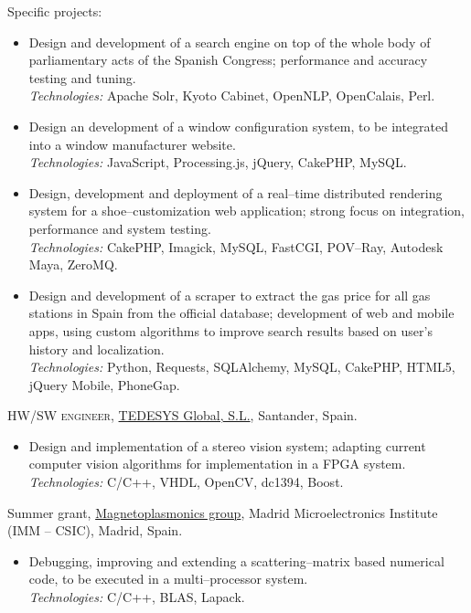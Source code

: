 \documentclass[11pt]{article}
\newcommand{\years}[1]{\marginnote{\scriptsize #1}}
\begin{document}
Specific projects:
\begin{itemize}
	\item  Design and development of a search engine on top of the whole body of parliamentary acts of the Spanish Congress; performance and accuracy testing and tuning.\\
	\textit{Technologies:} Apache Solr, Kyoto Cabinet, OpenNLP, OpenCalais, Perl.
	\item  Design an development of a window configuration system, to be integrated into a window manufacturer website.\\
	\textit{Technologies:} JavaScript, Processing.js, jQuery, CakePHP, MySQL.
	\item  Design, development and deployment of a real--time distributed rendering system for a shoe--customization web application; strong focus on integration, performance and system testing.\\
	\textit{Technologies:} CakePHP, Imagick, MySQL, FastCGI, POV--Ray, Autodesk Maya, ZeroMQ.
	\item  Design and development of a scraper to extract the gas price for all gas stations in Spain from the official database; development of web and mobile apps, using custom algorithms to improve search results based on user's history and localization.\\
	\textit{Technologies:} Python, Requests, SQLAlchemy, MySQL, CakePHP, HTML5, jQuery Mobile, PhoneGap.
\end{itemize}

\years{2011}\textsc{HW/SW engineer}, \href{http://www.tedesys.com}{TEDESYS Global, S.L.}, Santander, Spain.
\begin{itemize}
	\item  Design and implementation of a stereo vision system; adapting current computer vision algorithms for implementation in a FPGA system.\\
	\textit{Technologies:} C/C++, VHDL, OpenCV, dc1394, Boost.
\end{itemize}

\years{2008,2009}Summer grant, \href{http://www.imm.cnm.csic.es/magnetoplasmonics}{Magnetoplasmonics group}, Madrid Microelectronics Institute (IMM -- CSIC), Madrid, Spain.
\begin{itemize}
	\item  Debugging, improving and extending a scattering--matrix based numerical code, to be executed in a multi--processor system.\\
	\textit{Technologies:} C/C++, BLAS, Lapack.
\end{itemize}
\end{document}
